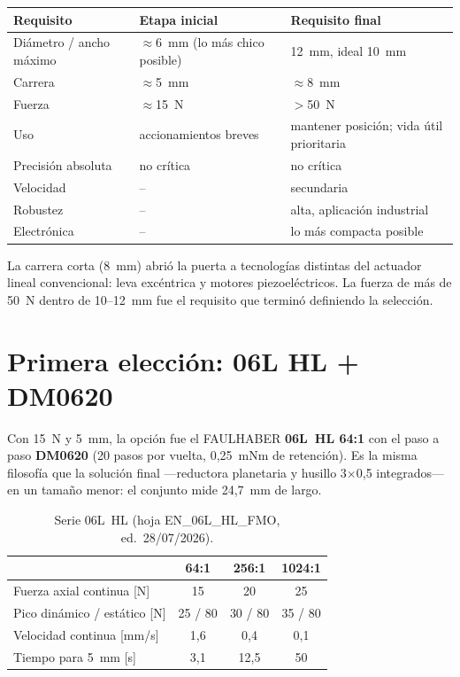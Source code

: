 \documentclass[11pt,a4paper]{article}
\begin{document}
\begin{table}[H]\centering\small
\begin{tabular}{l l l}
\toprule
Requisito & Etapa inicial & Requisito final\\
\midrule
Diámetro / ancho máximo & $\approx$6~mm (lo más chico posible) & 12~mm, ideal 10~mm\\
Carrera                 & $\approx$5~mm                        & $\approx$8~mm\\
Fuerza                  & $\approx$15~N                        & $>$50~N\\
Uso                     & accionamientos breves                & mantener posición; vida útil prioritaria\\
Precisión absoluta      & no crítica                           & no crítica\\
Velocidad               & --                                   & secundaria\\
Robustez                & --                                   & alta, aplicación industrial\\
Electrónica             & --                                   & lo más compacta posible\\
\bottomrule
\end{tabular}
\end{table}

La carrera corta (8~mm) abrió la puerta a tecnologías distintas del actuador lineal convencional: leva
excéntrica y motores piezoeléctricos. La fuerza de más de 50~N dentro de 10--12~mm fue el requisito que
terminó definiendo la selección.

\section{Primera elección: 06L HL + DM0620}
Con 15~N y 5~mm, la opción fue el FAULHABER \textbf{06L~HL 64:1} con el paso a paso \textbf{DM0620}
(20 pasos por vuelta, 0,25~mNm de retención). Es la misma filosofía que la solución final ---reductora
planetaria y husillo 3$\times$0,5 integrados--- en un tamaño menor: el conjunto mide 24,7~mm de largo.

\begin{table}[H]\centering\small
\caption{Serie 06L~HL (hoja EN\_06L\_HL\_FMO, ed.\ 28/07/2026).}
\begin{tabular}{l c c c}
\toprule
 & 64:1 & 256:1 & 1024:1\\
\midrule
Fuerza axial continua [N]        & 15  & 20  & 25\\
Pico dinámico / estático [N]     & 25 / 80 & 30 / 80 & 35 / 80\\
Velocidad continua [mm/s]        & 1,6 & 0,4 & 0,1\\
Tiempo para 5~mm [s]             & 3,1 & 12,5 & 50\\
\bottomrule
\end{tabular}
\end{table}
\end{document}
